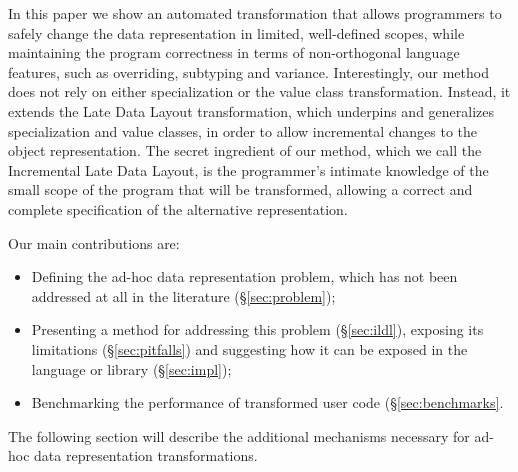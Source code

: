 In this paper we show an automated transformation that allows programmers to safely change the data representation in limited, well-defined scopes, while maintaining the program correctness in terms of non-orthogonal language features, such as overriding, subtyping and variance. Interestingly, our method does not rely on either specialization or the value class transformation. Instead, it extends the Late Data Layout transformation, which underpins and generalizes specialization and value classes, in order to allow incremental changes to the object representation. The secret ingredient of our method, which we call the Incremental Late Data Layout, is the programmer's intimate knowledge of the small scope of the program that will be transformed, allowing a correct and complete specification of the alternative representation.

Our main contributions are:
\begin{itemize}
  \item Defining the ad-hoc data representation problem, which has not been addressed at all in the literature (\S\ref{sec:problem});
  \item Presenting a method for addressing this problem (\S\ref{sec:ildl}), exposing its limitations (\S\ref{sec:pitfalls}) and suggesting how it can be exposed in the language or library (\S\ref{sec:impl});
  \item Benchmarking the performance of transformed user code (\S\ref{sec:benchmarks}.
\end{itemize}

The following section will describe the additional mechanisms necessary for ad-hoc data representation transformations.